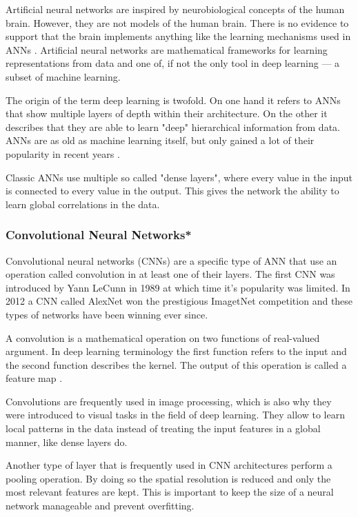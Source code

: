 Artificial neural networks are inspired by neurobiological concepts of the human brain. However, they are not models of the human brain. There is no evidence to support that the brain implements anything like the learning mechanisms used in ANNs \cite{Chollet2017}. Artificial neural networks are mathematical frameworks for learning representations from data and one of, if not the only tool in deep learning --- a subset of machine learning.

The origin of the term deep learning is twofold. On one hand it refers to ANNs that show multiple layers of depth within their architecture. On the other it describes that they are able to learn "deep" hierarchical information from data. ANNs are as old as machine learning itself, but only gained a lot of their popularity in recent years \cite{Chollet2017}.

Classic ANNs use multiple so called "dense layers", where every value in the input is connected to every value in the output. This gives the network the ability to learn global correlations in the data.

\subsubsection{Convolutional Neural Networks*}

Convolutional neural networks (CNNs) are a specific type of ANN that use an operation called convolution in at least one of their layers. The first CNN was introduced by Yann LeCunn \cite{LeCun1998} in 1989 at which time it's popularity was limited. In 2012 a CNN called AlexNet \cite{Krizhevsky} won the prestigious ImagetNet competition and these types of networks have been winning ever since.

A convolution is a mathematical operation on two functions of real-valued argument. In deep learning terminology the first function refers to the input and the second function describes the kernel. The output of this operation is called a feature map \cite{Goodfellow2016}.

Convolutions are frequently used in image processing, which is also why they were introduced to visual tasks in the field of deep learning. They allow to learn local patterns in the data instead of treating the input features in a global manner, like dense layers do.

Another type of layer that is frequently used in CNN architectures perform a pooling operation. By doing so the spatial resolution is reduced and only the most relevant features are kept. This is important to keep the size of a neural network manageable and prevent overfitting.

